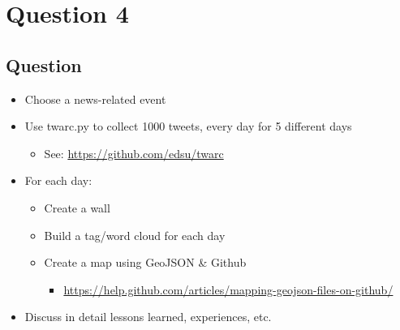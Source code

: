 \chapter{Question 4}
\label{question-4}
\section{Question}

\begin{itemize}
\item Choose a news-related event
\item Use twarc.py to collect 1000 tweets, every day for 5 different days
	\begin{itemize}
	\item See: \url{https://github.com/edsu/twarc}
	\end{itemize}
\item For each day:
	\begin{itemize}
		\item Create a wall
		\item Build a tag/word cloud for each day
		\item Create a map using GeoJSON \& Github
		\begin{itemize}
			\item \url{https://help.github.com/articles/mapping-geojson-files-on-github/}
		\end{itemize}
	\end{itemize}
\item Discuss in detail lessons learned, experiences, etc.
\end{itemize}


